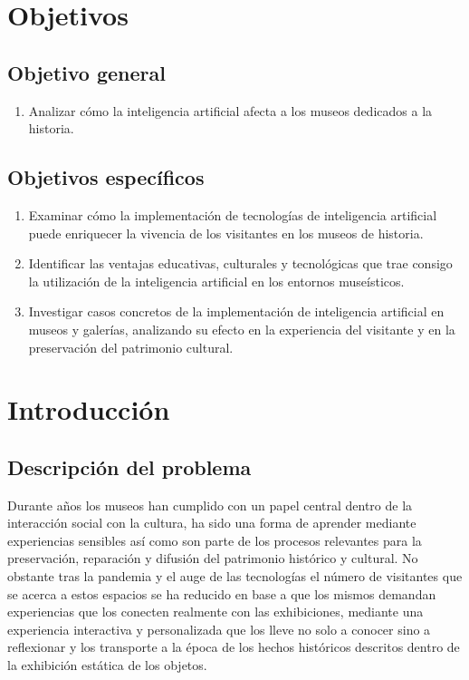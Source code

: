 \documentclass[pdflatex,sn-mathphys-num]{sn-jnl}%
\theoremstyle{thmstyleone}%
\theoremstyle{thmstyletwo}%
\theoremstyle{thmstylethree}%
\begin{document}
\section{Objetivos}
\subsection{Objetivo general}
\begin{enumerate}
    \item Analizar cómo la inteligencia artificial afecta a los museos dedicados a la historia.
\end{enumerate}

\subsection{Objetivos específicos}
\begin{enumerate}
    \item Examinar cómo la implementación de tecnologías de inteligencia artificial puede enriquecer la vivencia de los visitantes en los museos de historia.
    \item Identificar las ventajas educativas, culturales y tecnológicas que trae consigo la utilización de la inteligencia artificial en los entornos museísticos.
    \item Investigar casos concretos de la implementación de inteligencia artificial en museos y galerías, analizando su efecto en la experiencia del visitante y en la preservación del patrimonio cultural.
\end{enumerate}
  

\section{Introducción}\label{sec1}
\subsection{Descripción del problema}
Durante años los museos han cumplido con un papel central dentro de la interacción social con la cultura, ha sido una forma de aprender mediante experiencias sensibles así como son parte de los procesos relevantes para la preservación, reparación y difusión del patrimonio histórico y cultural. No obstante tras la pandemia y el auge de las tecnologías el número de visitantes que se acerca a estos espacios se ha reducido en base a que los mismos demandan experiencias que los conecten realmente con las exhibiciones, mediante una experiencia interactiva y personalizada que los lleve no solo a conocer sino a reflexionar y los transporte a la época de los hechos históricos descritos dentro de la exhibición estática de los objetos.
\end{document}
